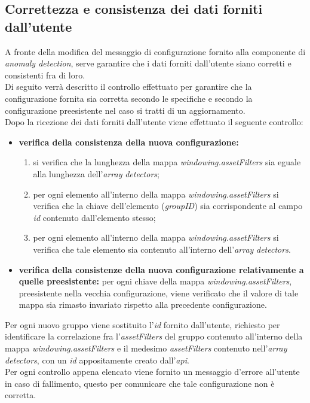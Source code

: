 \subsection{Correttezza e consistenza dei dati forniti dall'utente}
A fronte della modifica del messaggio di configurazione fornito alla componente di \textit{anomaly detection}, serve garantire che i dati forniti dall'utente siano corretti e consistenti fra di loro.\\
Di seguito verrà descritto il controllo effettuato per garantire che la configurazione fornita sia corretta secondo le specifiche e secondo la configurazione preesistente nel caso si tratti di un aggiornamento.\\
Dopo la ricezione dei dati forniti dall'utente viene effettuato il seguente controllo:
\begin{itemize}
	\item{\textbf{verifica della consistenza della nuova configurazione:}
		\begin{enumerate}
			\item{si verifica che la lunghezza della mappa \textit{windowing.assetFilters} sia eguale alla lunghezza dell'\textit{array} \textit{detectors};}
			\item{per ogni elemento all'interno della mappa \textit{windowing.assetFilters} si verifica che la chiave dell'elemento (\textit{groupID}) sia corrispondente al campo \textit{id} contenuto dall'elemento stesso;}
			\item{per ogni elemento all'interno della mappa \textit{windowing.assetFilters} si verifica che tale elemento sia contenuto all'interno dell'\textit{array} \textit{detectors}.}
		\end{enumerate}}
	\item{\textbf{verifica della consistenze della nuova configurazione relativamente a quelle preesistente:} per ogni chiave della mappa \textit{windowing.assetFilters}, preesistente nella vecchia configurazione, viene verificato che il valore di tale mappa sia rimasto invariato rispetto alla precedente configurazione.}
\end{itemize}

Per ogni nuovo gruppo viene sostituito l'\textit{id} fornito dall'utente, richiesto per identificare la correlazione fra l'\textit{assetFilters} del gruppo contenuto all'interno della mappa \textit{windowing.assetFilters} e il medesimo \textit{assetFilters} contenuto nell'\textit{array} \textit{detectors}, con un \textit{id} appositamente creato dall'\textit{\gls{api}}.\\
Per ogni controllo appena elencato viene fornito un messaggio d'errore all'utente in caso di fallimento, questo per comunicare che tale configurazione non è corretta.


